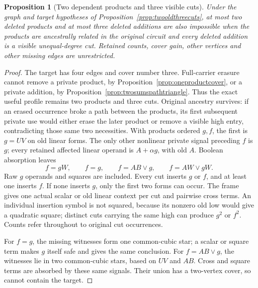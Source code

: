 \documentclass[11pt]{article}
\newtheorem{proposition}[theorem]{Proposition}
\theoremstyle{definition}
\theoremstyle{remark}
\begin{document}
\begin{proposition}[Two dependent products and three visible cuts]\label{prop:twodependentthreecuts}
Under the graph and target hypotheses of Proposition~\ref{prop:twooldthreecuts}, at most two deleted products and at most three deleted additions are also impossible when the products are ancestrally related in the original circuit and every deleted addition is a visible unequal-degree cut. Retained counts, cover gain, other vertices and other missing edges are unrestricted.
\end{proposition}
\begin{proof}
The target has four edges and cover number three. Full-carrier erasure cannot remove a private product, by Proposition~\ref{prop:oneproductcover}, or a private addition, by Proposition~\ref{prop:twosumspathtriangle}. Thus the exact useful profile remains two products and three cuts. Original ancestry survives: if an erased occurrence broke a path between the products, its first subsequent private use would either erase the later product or remove a visible high entry, contradicting those same two necessities. With products ordered $g,f$, the first is $g=UV$ on old linear forms. The only other nonlinear private signal preceding $f$ is $g$; every retained affected linear operand is $A+\alpha g$, with old $A$. Boolean absorption leaves
\[
 f=gW,\qquad f=g,\qquad f=AB\vee g,
 \qquad f=AW\vee gW.
\]
Raw $g$ operands and squares are included. Every cut inserts $g$ or $f$, and at least one inserts $f$. If none inserts $g$, only the first two forms can occur. The frame gives one actual scalar or old linear context per cut and pairwise cross terms. An individual insertion symbol is not squared, because its nonzero old low would give a quadratic square; distinct cuts carrying the same high can produce $g^2$ or $f^2$. Counts refer throughout to original cut occurrences.

For $f=g$, the missing witnesses form one common-cubic star; a scalar or square term makes $g$ itself safe and gives the same conclusion. For $f=AB\vee g$, the witnesses lie in two common-cubic stars, based on $UV$ and $AB$. Cross and square terms are absorbed by these same signals. Their union has a two-vertex cover, so cannot contain the target.


\end{proof}
\end{document}
